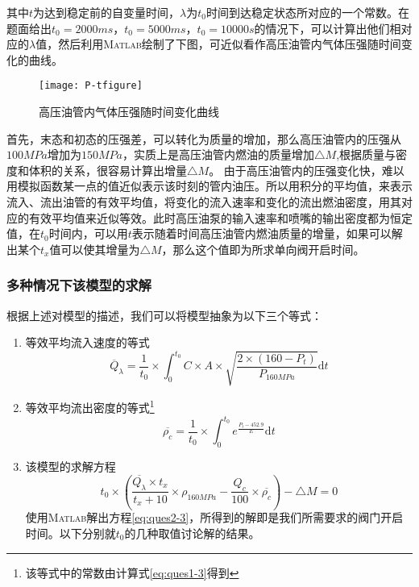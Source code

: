 \documentclass[withoutpreface,bwprint]{cumcmthesis} %
\begin{document}
其中$t$为达到稳定前的自变量时间，$\lambda$为$t_{0}$时间到达稳定状态所对应的一个常数。在题面给出$t_{0}=2000ms$，$t_{0}=5000ms$，$t_{0}=10000s$的情况下，可以计算出他们相对应的$\lambda$值，然后利用\textsc{Matlab}绘制了下图，可近似看作高压油管内气体压强随时间变化的曲线。

\begin{figure}[!h]
	\centering 
	\texttt{[image: P-tfigure]}
	\caption{高压油管内气体压强随时间变化曲线}
	\label{fig:f(t)-picture}
\end{figure}
\newpage
首先，末态和初态的压强差，可以转化为质量的增加，那么高压油管内的压强从${100MPa}$增加为${150MPa}$，实质上是高压油管内燃油的质量增加${\triangle M}$,根据质量与密度和体积的关系，很容易计算出增量${\triangle M}$。
由于高压油管内的压强变化快，难以用模拟函数某一点的值近似表示该时刻的管内油压。所以用积分的平均值，来表示流入、流出油管的有效平均值，将变化的流入速率和变化的流出燃油密度，用其对应的有效平均值来近似等效。此时高压油泵的输入速率和喷嘴的输出密度都为恒定值，在$t_{0}$时间内，可以用$t$表示随着时间高压油管内燃油质量的增量，如果可以解出某个$t_{x}$值可以使其增量为${\triangle M}$，那么这个值即为所求单向阀开启时间。
\subsubsection{多种情况下该模型的求解}
根据上述对模型的描述，我们可以将模型抽象为以下三个等式：
\begin{enumerate}
	\item 等效平均流入速度的等式
	\begin{equation*}
	\overline{Q}_{\lambda} = \frac{1}{t_{0}}\times \int_{0}^{t_{0}} C\times A\times \sqrt{\frac{2\times (160-P_{t})}{P_{160MPa}}}{\text{d}t}\label{eq:ques2-1}	
	\end{equation*}
	\item 等效平均流出密度的等式\footnote{该等式中的常数由计算式\cref{eq:ques1-3}得到}
	\begin{equation*}
	\overline{\rho_{c}} = \frac{1}{t_{0}}\times \int_{0}^{t_{0}} e^{\frac{P_{t}-452.9}{E}}{\text{d}t}\label{eq:ques2-2}	
	\end{equation*}
	\item 该模型的求解方程
	\begin{equation}
	t_{0}\times(\frac{\overline{Q_{\lambda}}\times t_{x}}{t_{x}+10}\times \rho_{160MPa}-\frac{Q_{c}}{100}\times \overline{\rho_{c}})-\triangle M = 0\label{eq:ques2-3}	
	\end{equation}
	使用\textsc{Matlab}解出方程\cref{eq:ques2-3}，所得到的解即是我们所需要求的阀门开启时间。以下分别就$t_{0}$的几种取值讨论解的结果。
\end{enumerate}
\end{document}
